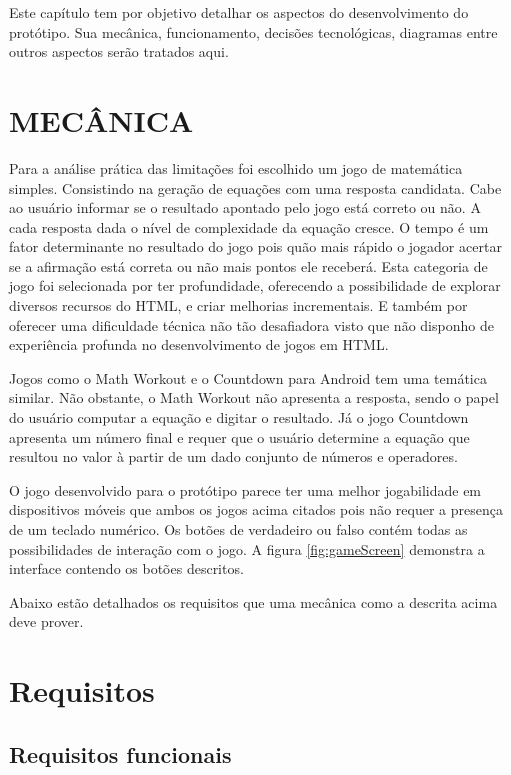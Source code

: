 Este capítulo tem por objetivo detalhar os aspectos do desenvolvimento
do protótipo. Sua mecânica, funcionamento, decisões tecnológicas,
diagramas entre outros aspectos serão tratados aqui.

\section{MECÂNICA}

Para a análise prática das limitações foi escolhido um jogo de
matemática simples. Consistindo na geração de equações com uma
resposta candidata. Cabe ao usuário informar se o resultado apontado
pelo jogo está correto ou não. A cada resposta dada o nível de
complexidade da equação cresce. O tempo é um fator determinante
no resultado do jogo pois quão mais rápido o jogador acertar se a
afirmação está correta ou não mais pontos ele receberá.
Esta categoria de jogo foi selecionada por ter profundidade, oferecendo
a possibilidade de explorar diversos recursos do HTML, e criar melhorias
incrementais. E também por oferecer uma dificuldade técnica não
tão desafiadora visto que não disponho de experiência profunda no
desenvolvimento de jogos em HTML.

Jogos como o Math Workout e o Countdown para Android tem uma temática
similar. Não obstante, o Math Workout não apresenta a resposta, sendo
o papel do usuário computar a equação e digitar o resultado. Já o jogo
Countdown apresenta um número final e requer que o usuário determine
a equação que resultou no valor à partir de um dado conjunto de
números e operadores.

O jogo desenvolvido para o protótipo parece ter uma melhor jogabilidade
em dispositivos móveis que ambos os jogos acima citados pois não
requer a presença de um teclado numérico. Os botões de verdadeiro
ou falso contém todas as possibilidades de interação com o jogo. A
figura \ref{fig:gameScreen} demonstra a interface contendo os botões descritos.

Abaixo estão detalhados os requisitos que uma mecânica como a descrita
acima deve prover.

\section{Requisitos}

\subsection{Requisitos funcionais}

